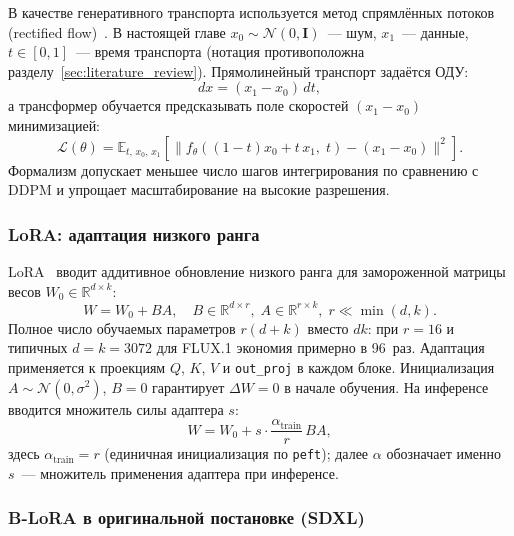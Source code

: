 В качестве генеративного транспорта используется метод спрямлённых потоков (rectified flow)~\cite{liu2022rectifiedflow}. В настоящей главе $x_0 \sim \mathcal{N}(0, \mathbf{I})$~--- шум, $x_1$~--- данные, $t \in [0, 1]$~--- время транспорта (нотация противоположна разделу~\ref{sec:literature_review}). Прямолинейный транспорт задаётся ОДУ:
\begin{equation}
    dx = (x_1 - x_0)\,dt,
    \label{eq:rectflow}
\end{equation}
а трансформер обучается предсказывать поле скоростей $(x_1 - x_0)$ минимизацией:
\begin{equation}
    \mathcal{L}(\theta) = \mathbb{E}_{t,\,x_0,\,x_1}\!\left[\bigl\|f_\theta\!\left((1-t)x_0 + t\,x_1,\;t\right) - (x_1 - x_0)\bigr\|^2\right].
    \label{eq:flow_loss}
\end{equation}
Формализм допускает меньшее число шагов интегрирования по сравнению с DDPM и упрощает масштабирование на высокие разрешения.

\subsubsection*{LoRA: адаптация низкого ранга}

LoRA~\cite{hu2022lora} вводит аддитивное обновление низкого ранга для замороженной матрицы весов $W_0 \in \mathbb{R}^{d \times k}$:
\begin{equation}
    W = W_0 + BA, \quad B \in \mathbb{R}^{d \times r},\; A \in \mathbb{R}^{r \times k},\; r \ll \min(d, k).
    \label{eq:lora}
\end{equation}
Полное число обучаемых параметров $r(d+k)$ вместо $dk$: при $r{=}16$ и типичных $d{=}k{=}3072$ для FLUX.1 экономия примерно в 96~раз. Адаптация применяется к проекциям $Q$, $K$, $V$ и \texttt{out\_proj} в каждом блоке. Инициализация $A \sim \mathcal{N}(0, \sigma^2)$, $B = 0$ гарантирует $\Delta W = 0$ в начале обучения. На инференсе вводится множитель силы адаптера $s$:
\begin{equation}
    W = W_0 + s \cdot \frac{\alpha_\text{train}}{r}\, BA,
    \label{eq:lora_scale}
\end{equation}
здесь $\alpha_\text{train}{=}r$ (единичная инициализация по \texttt{peft}); далее $\alpha$ обозначает именно $s$~--- множитель применения адаптера при инференсе.

\subsubsection*{B-LoRA в оригинальной постановке (SDXL)}

